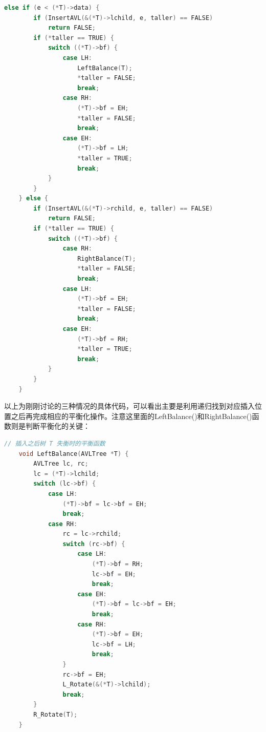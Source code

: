 
\begin{lstlisting}[language=C, caption={平衡二叉树的插入}]
    else if (e < (*T)->data) {
        if (InsertAVL(&(*T)->lchild, e, taller) == FALSE)
            return FALSE;
        if (*taller == TRUE) {
            switch ((*T)->bf) {
                case LH:
                    LeftBalance(T);
                    *taller = FALSE;
                    break;
                case RH:
                    (*T)->bf = EH;
                    *taller = FALSE;
                    break;
                case EH:
                    (*T)->bf = LH;
                    *taller = TRUE;
                    break;
            }
        }
    } else {
        if (InsertAVL(&(*T)->rchild, e, taller) == FALSE)
            return FALSE;
        if (*taller == TRUE) {
            switch ((*T)->bf) {
                case RH:
                    RightBalance(T);
                    *taller = FALSE;
                    break;
                case LH:
                    (*T)->bf = EH;
                    *taller = FALSE;
                    break;
                case EH:
                    (*T)->bf = RH;
                    *taller = TRUE;
                    break;
            }
        }
    }
\end{lstlisting}

以上为刚刚讨论的三种情况的具体代码，可以看出主要是利用递归找到对应插入位置之后再完成相应的平衡化操作。注意这里面的LeftBalance()和RightBalance()函数则是判断平衡化的关键：


\begin{lstlisting}[language=C, caption={插入后对左子树的平衡化处理}]
    // 插入之后树 T 失衡时的平衡函数
    void LeftBalance(AVLTree *T) {
        AVLTree lc, rc;
        lc = (*T)->lchild;
        switch (lc->bf) {
            case LH:
                (*T)->bf = lc->bf = EH;
                break;
            case RH:
                rc = lc->rchild;
                switch (rc->bf) {
                    case LH:
                        (*T)->bf = RH;
                        lc->bf = EH;
                        break;
                    case EH:
                        (*T)->bf = lc->bf = EH;
                        break;
                    case RH:
                        (*T)->bf = EH;
                        lc->bf = LH;
                        break;
                }
                rc->bf = EH;
                L_Rotate(&(*T)->lchild);
                break;
        }
        R_Rotate(T);
    }
\end{lstlisting}

